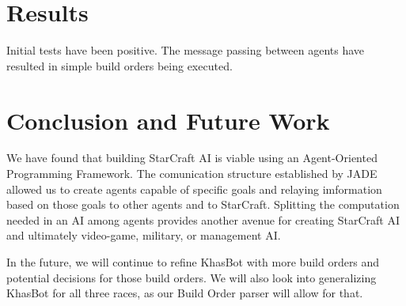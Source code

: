 \documentclass[letterpaper]{article}
\begin{document}
\section{Results}
Initial tests have been positive.  The message passing between agents have resulted in simple build orders being executed.

\section{Conclusion and Future Work}
We have found that building StarCraft AI is viable using an Agent-Oriented Programming Framework.  The comunication structure established by JADE allowed us to create agents capable of specific goals and relaying imformation based on those goals to other agents and to StarCraft.  Splitting the computation needed in an AI among agents provides another avenue for creating StarCraft AI and ultimately video-game, military, or management AI.

In the future, we will continue to refine KhasBot with more build orders and potential decisions for those build orders.  We will also look into generalizing KhasBot for all three races, as our Build Order parser will allow for that.
\end{document}

